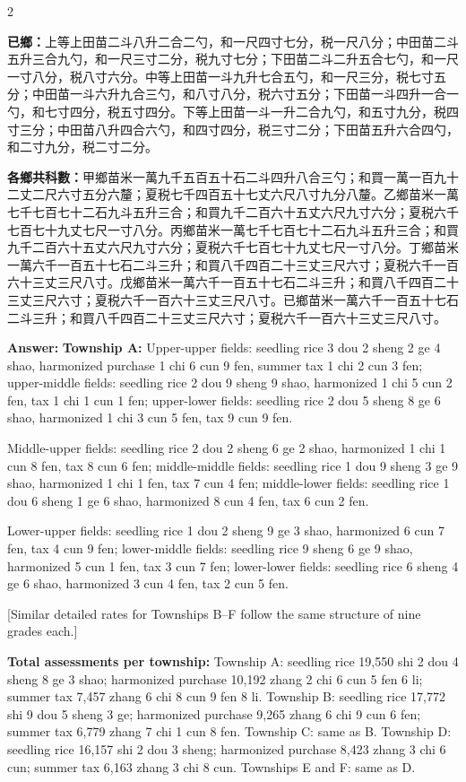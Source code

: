 \documentclass[11pt,a4paper]{article}
\newcommand{\AnswerEn}[1]{\par\noindent\textbf{\color{answercolor}Answer:} #1\par}
\begin{document}
\begin{paracol}{2}
{\textbf{已鄉：}上等上田苗二斗八升二合二勺，和一尺四寸七分，税一尺八分；中田苗二斗五升三合九勺，和一尺三寸二分，税九寸七分；下田苗二斗二升五合七勺，和一尺一寸八分，税八寸六分。中等上田苗一斗九升七合五勺，和一尺三分，税七寸五分；中田苗一斗六升九合三勺，和八寸八分，税六寸五分；下田苗一斗四升一合一勺，和七寸四分，税五寸四分。下等上田苗一斗一升二合九勺，和五寸九分，税四寸三分；中田苗八升四合六勺，和四寸四分，税三寸二分；下田苗五升六合四勺，和二寸九分，税二寸二分。

\textbf{各鄉共科數：}甲鄉苗米一萬九千五百五十石二斗四升八合三勺；和買一萬一百九十二丈二尺六寸五分六釐；夏税七千四百五十七丈六尺八寸九分八釐。乙鄉苗米一萬七千七百七十二石九斗五升三合；和買九千二百六十五丈六尺九寸六分；夏税六千七百七十九丈七尺一寸八分。丙鄉苗米一萬七千七百七十二石九斗五升三合；和買九千二百六十五丈六尺九寸六分；夏税六千七百七十九丈七尺一寸八分。丁鄉苗米一萬六千一百五十七石二斗三升；和買八千四百二十三丈三尺六寸；夏税六千一百六十三丈三尺八寸。戊鄉苗米一萬六千一百五十七石二斗三升；和買八千四百二十三丈三尺六寸；夏税六千一百六十三丈三尺八寸。已鄉苗米一萬六千一百五十七石二斗三升；和買八千四百二十三丈三尺六寸；夏税六千一百六十三丈三尺八寸。}

\switchcolumn

\AnswerEn{
\textbf{Township A:} Upper-upper fields: seedling rice 3 dou 2 sheng 2 ge 4 shao, harmonized purchase 1 chi 6 cun 9 fen, summer tax 1 chi 2 cun 3 fen; upper-middle fields: seedling rice 2 dou 9 sheng 9 shao, harmonized 1 chi 5 cun 2 fen, tax 1 chi 1 cun 1 fen; upper-lower fields: seedling rice 2 dou 5 sheng 8 ge 6 shao, harmonized 1 chi 3 cun 5 fen, tax 9 cun 9 fen.

Middle-upper fields: seedling rice 2 dou 2 sheng 6 ge 2 shao, harmonized 1 chi 1 cun 8 fen, tax 8 cun 6 fen; middle-middle fields: seedling rice 1 dou 9 sheng 3 ge 9 shao, harmonized 1 chi 1 fen, tax 7 cun 4 fen; middle-lower fields: seedling rice 1 dou 6 sheng 1 ge 6 shao, harmonized 8 cun 4 fen, tax 6 cun 2 fen.

Lower-upper fields: seedling rice 1 dou 2 sheng 9 ge 3 shao, harmonized 6 cun 7 fen, tax 4 cun 9 fen; lower-middle fields: seedling rice 9 sheng 6 ge 9 shao, harmonized 5 cun 1 fen, tax 3 cun 7 fen; lower-lower fields: seedling rice 6 sheng 4 ge 6 shao, harmonized 3 cun 4 fen, tax 2 cun 5 fen.

[Similar detailed rates for Townships B--F follow the same structure of nine grades each.]

\textbf{Total assessments per township:} Township A: seedling rice 19,550 shi 2 dou 4 sheng 8 ge 3 shao; harmonized purchase 10,192 zhang 2 chi 6 cun 5 fen 6 li; summer tax 7,457 zhang 6 chi 8 cun 9 fen 8 li. Township B: seedling rice 17,772 shi 9 dou 5 sheng 3 ge; harmonized purchase 9,265 zhang 6 chi 9 cun 6 fen; summer tax 6,779 zhang 7 chi 1 cun 8 fen. Township C: same as B. Township D: seedling rice 16,157 shi 2 dou 3 sheng; harmonized purchase 8,423 zhang 3 chi 6 cun; summer tax 6,163 zhang 3 chi 8 cun. Townships E and F: same as D.}


\end{paracol}
\end{document}
